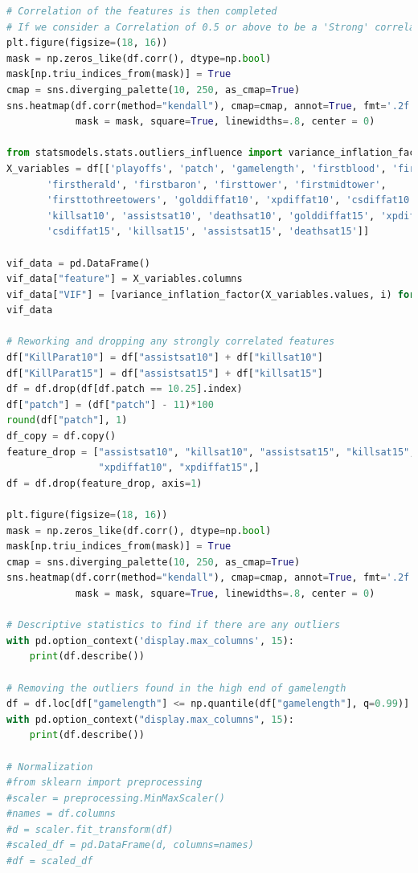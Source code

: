 \begin{lstlisting}[language=python,label={lst:pythoncode}]
# Correlation of the features is then completed
# If we consider a Correlation of 0.5 or above to be a 'Strong' correlation
plt.figure(figsize=(18, 16))
mask = np.zeros_like(df.corr(), dtype=np.bool)
mask[np.triu_indices_from(mask)] = True
cmap = sns.diverging_palette(10, 250, as_cmap=True)
sns.heatmap(df.corr(method="kendall"), cmap=cmap, annot=True, fmt='.2f', vmin=-1, vmax=1,
            mask = mask, square=True, linewidths=.8, center = 0)

from statsmodels.stats.outliers_influence import variance_inflation_factor
X_variables = df[['playoffs', 'patch', 'gamelength', 'firstblood', 'firstdragon',
       'firstherald', 'firstbaron', 'firsttower', 'firstmidtower',
       'firsttothreetowers', 'golddiffat10', 'xpdiffat10', 'csdiffat10',
       'killsat10', 'assistsat10', 'deathsat10', 'golddiffat15', 'xpdiffat15',
       'csdiffat15', 'killsat15', 'assistsat15', 'deathsat15']]

vif_data = pd.DataFrame()
vif_data["feature"] = X_variables.columns
vif_data["VIF"] = [variance_inflation_factor(X_variables.values, i) for i in range(len(X_variables.columns))]
vif_data

# Reworking and dropping any strongly correlated features
df["KillParat10"] = df["assistsat10"] + df["killsat10"]
df["KillParat15"] = df["assistsat15"] + df["killsat15"]
df = df.drop(df[df.patch == 10.25].index)
df["patch"] = (df["patch"] - 11)*100
round(df["patch"], 1)
df_copy = df.copy()
feature_drop = ["assistsat10", "killsat10", "assistsat15", "killsat15", "golddiffat10", "golddiffat15",
                "xpdiffat10", "xpdiffat15",]
df = df.drop(feature_drop, axis=1)

plt.figure(figsize=(18, 16))
mask = np.zeros_like(df.corr(), dtype=np.bool)
mask[np.triu_indices_from(mask)] = True
cmap = sns.diverging_palette(10, 250, as_cmap=True)
sns.heatmap(df.corr(method="kendall"), cmap=cmap, annot=True, fmt='.2f', vmin=-1, vmax=1,
            mask = mask, square=True, linewidths=.8, center = 0)

# Descriptive statistics to find if there are any outliers
with pd.option_context('display.max_columns', 15):
    print(df.describe())

# Removing the outliers found in the high end of gamelength
df = df.loc[df["gamelength"] <= np.quantile(df["gamelength"], q=0.99)]
with pd.option_context("display.max_columns", 15):
    print(df.describe())

# Normalization
#from sklearn import preprocessing
#scaler = preprocessing.MinMaxScaler()
#names = df.columns
#d = scaler.fit_transform(df)
#scaled_df = pd.DataFrame(d, columns=names)
#df = scaled_df


\end{lstlisting}
